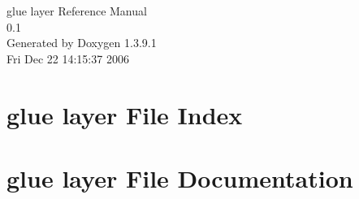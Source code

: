 \documentclass[a4paper]{book}
\begin{document}
\begin{titlepage}
\vspace*{7cm}
\begin{center}
{\Large glue layer Reference Manual\\[1ex]\large 0.1 }\\
\vspace*{1cm}
{\large Generated by Doxygen 1.3.9.1}\\
\vspace*{0.5cm}
{\small Fri Dec 22 14:15:37 2006}\\
\end{center}
\end{titlepage}
\clearemptydoublepage
{}
\tableofcontents
\clearemptydoublepage
{}
\chapter{glue layer File Index}

\chapter{glue layer File Documentation}

\printindex
\end{document}
